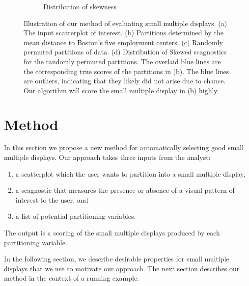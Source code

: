 \begin{figure}
\begin{subfigure}[t]{2.5in}
	\caption{Distribution of skewness}
	 \label{fig:method_dist}
     \end{subfigure}
   \caption{Illustration of our method of evaluating small multiple displays. (a) The input scatterplot of interest. (b) Partitions determined by the mean distance to Boston's five employment centers. (c) Randomly permuted partitions of data. (d) Distribution of Skewed scagnostics for the randomly permuted partitions. The overlaid blue lines are the corresponding true scores of the partitions in (b). The blue lines are outliers, indicating that they likely did not arise due to chance. Our algorithm will score the small multiple display in (b) highly.}
\end{figure}


\section{Method}
\label{sec:method}

In this section we propose a new method for automatically selecting good small multiple displays. Our approach takes three inputs from the analyst:
\begin{enumerate}
\item a scatterplot which the user wants to partition into a small multiple display,
\item a scagnostic that measures the presence or absence of a visual pattern of interest to the user, and
\item a list of potential partitioning variables.
\end{enumerate}
The output is a scoring of the small multiple displays produced by each partitioning variable.

In the following section, we describe desirable properties for small multiple displays that we use to motivate our approach. The next section describes our method in the context of a running example.


